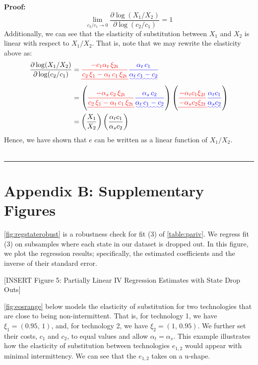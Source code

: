 \documentclass[11pt,a4paper,leqno]{extarticle}
\newenvironment{proof}[1][Proof]{\noindent\textbf{#1:} }{\ \rule{0.5em}{0.5em}}
\providecommand{\DIFadd}[1]{{\protect\color{blue}\uwave{#1}}} %
\providecommand{\DIFdel}[1]{{\protect\color{red}\sout{#1}}}                      %
\providecommand{\DIFaddbegin}{} %
\providecommand{\DIFaddend}{} %
\providecommand{\DIFdelbegin}{} %
\providecommand{\DIFdelend}{} %
\begin{document}
\begin{proof}
	$$ \lim_{c_2/c_1 \to 0} \frac{\partial \log(X_1/X_2)}{\partial \log(c_2/c_1)} = 1$$
	Additionally, we can see that the elasticity of substitution between $X_1$ and $X_2$ is linear with respect to $X_1/X_2$. That is, note that we may rewrite the elasticity above as:
	\begin{align*}
	\frac{\partial \log(X_1/X_2)}{\partial \log(c_2/c_1)} &= \DIFdelbegin \DIFdel{\frac{-c_1 \alpha _{t}\,\xi _{\mathrm{2t}}}{c_2\,\xi_1-\alpha _{t}\,c_{1}\,\xi _{\mathrm{2t}}} }\DIFdelend \DIFaddbegin \DIFadd{\frac{\alpha _{t}\,c_{1} }{\alpha _{t}\,c_{1} - c_2}}\DIFaddend \\
	&= \left( \DIFdelbegin \DIFdel{\frac{-\alpha _{s}\,c_{2}\,\xi _{\mathrm{2t}}}{c_2\,\xi_1-\alpha _{t}\,c_{1}\,\xi _{\mathrm{2t}}} }\DIFdelend \DIFaddbegin \DIFadd{\frac{\alpha _{s}\,c_{2} }{\alpha _{t}\,c_{1} - c_2} }\DIFaddend \right) \left( \DIFdelbegin \DIFdel{\frac{- \alpha_t c_1 \xi_{2t} }{- \alpha_s c_2 \xi_{2t}} }\DIFdelend \DIFaddbegin \DIFadd{\frac{ \alpha_t c_1 }{ \alpha_s c_2 } }\DIFaddend \right)\\
	&= \left( \frac{X_1}{X_2} \right) \left( \frac{ \alpha_t c_1  }{\alpha_s c_2 } \right)
	\end{align*}
	Hence, we have shown that $e$ can be written as a linear function of $X_1/X_2$. 
	\\ \hfill
\end{proof}


\pagebreak
	
	
	
	
	
	\section{Appendix B: Supplementary Figures}
	\label{sec:AppendixB}
	
	\autoref{fig:regstaterobust} is a robustness check for fit (3) of \autoref{table:pariv}. We regress fit (3) on subsamples where each state in our dataset is dropped out. In this figure, we plot the regression results; specifically, the estimated coefficients and the inverse of their standard error. 
	
	\vspace{0.15in}
	\begin{center}
		[INSERT Figure 5: Partially Linear IV Regression Estimates with State Drop Outs]
	\end{center}
	\vspace{0.15in}
	
	
	\autoref{fig:eosrange} below models the elasticity of substitution for two technologies that are close to being non-intermittent. That is, for technology 1, we have $\xi_1 = (0.95,\, 1)$, and, for technology 2, we have $\xi_2 = (1, \,0.95)$. We further set their costs, $c_1$ and $c_2$, to equal values and allow $\alpha_t = \alpha_s$. This example illustrates how the elasticity of substitution between technologies $e_{1,2}$ would appear with minimal intermittency. We can see that the $e_{1,2}$ takes on a u-shape. 
	
\end{document}
